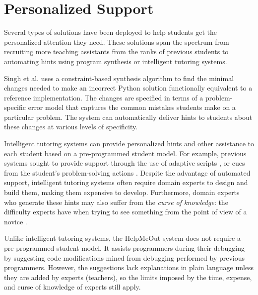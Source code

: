 \section{Personalized Support}
Several types of solutions have been deployed to help students get the personalized attention they need. These solutions span the spectrum from recruiting more teaching assistants from the ranks of previous students \cite{communityTAs} to automating hints using program synthesis or intelligent tutoring systems. 

Singh et al. \cite{rishabh} uses a constraint-based synthesis algorithm to find the minimal changes needed to make an incorrect Python solution functionally equivalent to a reference implementation. The changes are specified in terms of a problem-specific error model that captures the common mistakes students make on a particular problem. The system can automatically deliver hints to students about these changes at various levels of specificity. 

Intelligent tutoring systems can provide personalized hints and other assistance to each student based on a pre-programmed student model. For example, previous systems sought to provide support through the use of adaptive scripts \cite{kumar2007tutorial}, or cues from the student’s problem-solving actions \cite{diziol}. Despite the advantage of automated support, intelligent tutoring systems often require domain experts to design and build them, making them expensive to develop.  Furthermore, domain experts who generate these hints may also suffer from the {\it curse of knowledge}: the difficulty experts have when trying to see something from the point of view of a novice \cite{curse}. 

Unlike intelligent tutoring systems, the HelpMeOut system \cite{helpmeout} does not require a pre-programmed student model. It assists programmers during their debugging by suggesting code modifications mined from debugging performed by previous programmers. However, the suggestions lack explanations in plain language unless they are added by experts (teachers), so the limits imposed by the time, expense, and curse of knowledge of experts still apply.

